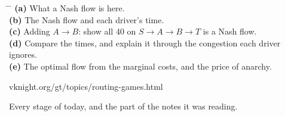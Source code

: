 \hspace{0.6cm}
\begin{minipage}{0.92\linewidth}
{\large
\begin{tabbing}
\hspace{1.2cm} \= \hspace{17cm} \= \kill
\textbf{(a)} \> What a Nash flow is here. \> [3]\\[0.55em]
\textbf{(b)} \> The Nash flow and each driver's time. \> [5]\\[0.55em]
\textbf{(c)} \> Adding $A \to B$: show all 40 on $S \to A \to B \to T$ is a
  Nash flow. \> [7]\\[0.55em]
\textbf{(d)} \> Compare the times, and explain it through the congestion each
  driver ignores. \> [5]\\[0.55em]
\textbf{(e)} \> The optimal flow from the marginal costs, and the price of
  anarchy. \> [5]
\end{tabbing}}
\end{minipage}

\vspace{1.2cm}

\begin{center}
{\large\color{inkgrey} vknight.org/gt/topics/routing-games.html}
\end{center}

\newpage
\nonotes
{}

\vspace{0.3cm}

{\large Every stage of today, and the part of the notes it was reading.}

\vspace{0.35cm}


